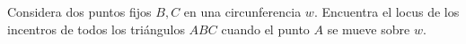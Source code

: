 Considera dos puntos fijos $B,C$ en una circunferencia $w$. Encuentra el locus de los incentros de todos los triángulos $ABC$ cuando el punto $A$ se mueve sobre $w$.
